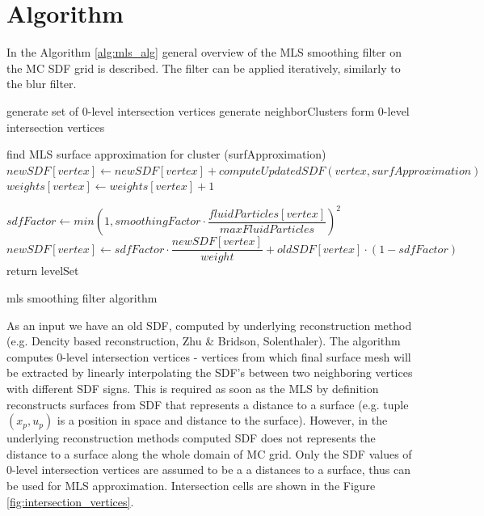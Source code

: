 \section{Algorithm}
In the Algorithm \ref{alg:mls_alg} general overview of the MLS smoothing filter on the MC SDF grid is described. The filter can be applied iteratively, similarly to the blur filter.
\begin{algorithm}[H]
	\scriptsize
	\begin{algorithmic}
		\State generate set of 0-level intersection vertices 
		\State generate neighborClusters form 0-level intersection vertices 
			
			\State find MLS surface approximation for cluster (surfApproximation)
				\State $newSDF[vertex] \gets newSDF[vertex] + computeUpdatedSDF(vertex, surfApproximation)$
				\State $weights[vertex] \gets weights[vertex] + 1$
			\EndFor
		\EndFor

			\State $sdfFactor \gets min\left(1, smoothingFactor \cdot \dfrac{fluidParticles[vertex]}{maxFluidParticles}\right)^2$
			\State $newSDF[vertex] \gets sdfFactor \cdot \dfrac{newSDF[vertex]}{weight} + oldSDF[vertex] \cdot (1 - sdfFactor)$
		\EndFor
		\State return levelSet
	\end{algorithmic}
	\caption{mls smoothing filter algorithm}
	\label{alg:mls_alg}
\end{algorithm}
As an input we have an old SDF, computed by underlying reconstruction method (e.g. Dencity based reconstruction, Zhu \& Bridson, Solenthaler). The algorithm computes 0-level intersection vertices - vertices from which final surface mesh will be extracted by linearly interpolating the SDF's between two neighboring vertices with different SDF signs. This is required as soon as the MLS by definition reconstructs surfaces from SDF that represents a distance to a surface (e.g. tuple $(x_p, u_p)$ is a position in space and distance to the surface). However, in the underlying reconstruction methods computed SDF does not represents the distance to a surface along the whole domain of MC grid. Only the SDF values of 0-level intersection vertices are assumed to be a a distances to a surface, thus can be used for MLS approximation. Intersection cells are shown in the Figure \ref{fig:intersection_vertices}.\\
